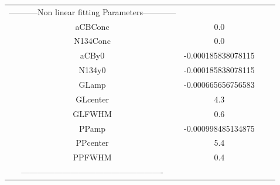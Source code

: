\documentclass{article}
\begin{document}
\begin{tabular}{c c c c}

-----------Non linear fitting Parameters------------\\
aCBConc    &0.0\\
N134Conc   &0.0\\
aCBy0      &-0.000185838078115\\
N134y0     &-0.000185838078115\\
GLamp      &-0.000665656756583\\
GLcenter   &4.3\\
GLFWHM     &0.6\\
PPamp      &-0.000998485134875\\
PPcenter   &5.4\\
PPFWHM     &0.4\\
----------------------------------------------------\\


\end{tabular}
\end{document}
